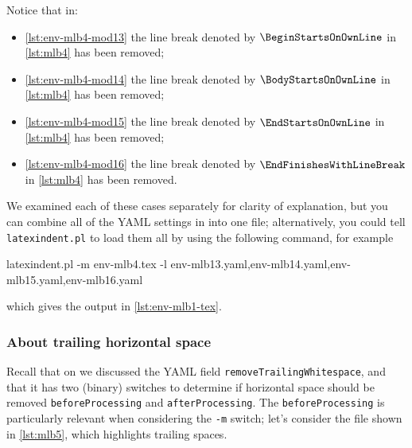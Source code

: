 	\begin{minipage}{.45\linewidth}
	\end{minipage}
	\hfill
	\begin{minipage}{.45\linewidth}
	\end{minipage}

	Notice that in: \begin{itemize} \item \cref{lst:env-mlb4-mod13} the line break denoted by $\BeginStartsOnOwnLine$ in \cref{lst:mlb4} has been removed;
		\item \cref{lst:env-mlb4-mod14} the line break denoted by $\BodyStartsOnOwnLine$ in \cref{lst:mlb4} has been removed;
		\item \cref{lst:env-mlb4-mod15} the line break denoted by $\EndStartsOnOwnLine$ in \cref{lst:mlb4} has been removed;
		\item \cref{lst:env-mlb4-mod16} the line break denoted by $\EndFinishesWithLineBreak$ in \cref{lst:mlb4} has been removed.
	\end{itemize}
	We examined each of these cases separately for clarity of explanation, but you can combine all of the YAML settings in  into one file; alternatively, you could tell \texttt{latexindent.pl} to load them all by using the following command, for example \begin{widepage} \begin{commandshell}
latexindent.pl -m env-mlb4.tex -l env-mlb13.yaml,env-mlb14.yaml,env-mlb15.yaml,env-mlb16.yaml
\end{commandshell} \end{widepage} which gives the output in \vref{lst:env-mlb1-tex}.

\subsubsection{About trailing horizontal space}
	Recall that on  we discussed the YAML field \texttt{removeTrailingWhitespace}, and that it has two (binary) switches to determine if horizontal space should be removed \texttt{beforeProcessing} and \texttt{afterProcessing}.
	The \texttt{beforeProcessing} is particularly relevant when considering the \texttt{-m} switch; let's consider the file shown in \cref{lst:mlb5}, which highlights trailing spaces.

